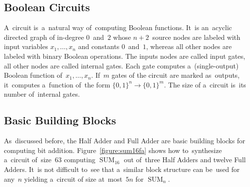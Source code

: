 \documentclass[sigconf, review, anonymous]{acmart}
\DeclareMathOperator{\SUM}{SUM}
\begin{document}
\subsection{Boolean Circuits}
A~circuit is~a~natural way of~computing Boolean functions.
It~is an~acyclic directed graph of in-degree $0$~and~$2$ whose $n+2$~source
nodes are labeled with input variables
$x_1, \dotsc, x_n$ and constants $0$~and~$1$, whereas all other nodes
are labeled with binary Boolean operations.
The inputs nodes are called input gates, all other nodes are called internal gates.
Each gate computes
a~(single-output) Boolean function of~$x_1, \dotsc, x_n$. If~$m$ gates of the
circuit are marked as~outputs, it~computes a~function of~the form $\{0,1\}^n \to \{0,1\}^m$.
The size of a~circuit is~its number of~internal gates.

\subsection{Basic Building Blocks}
As~discussed before, the Half Adder and Full Adder are basic building
blocks for computing bit addition. Figure~\ref{figure:sum16fa}
shows how to~synthesize a~circuit of~size~$63$ computing $\SUM_{16}$
out of~three Half Adders and twelve Full Adders.
It~is not difficult to~see that a~similar block structure can
be~used for any~$n$ yielding a~circuit of size at~most~$5n$ for $\SUM_n$.
\end{document}
